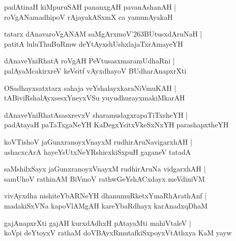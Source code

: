 \documentclass[twoside,12pt,openright]{book}
\def\S{\char'263}
\newcounter{shloka}[chapter]
\begin{document}
\begin{shloka}%
padAtinaH kiMpuruSAH pananxgAH pavanAshanAH |\\
roVgANamadhipoV rAjayakASxmX ca yamunAyakaH
\end{shloka}

\begin{shloka}%
tatarx dAnavaroVgANAM saMgArxmoV\S BUtusxdAruNaH |\\
patitA luluThuBuRmw deYtAyxshUshxlajaTxrAmayeYH
\end{shloka}

\begin{shloka}%
dAnaveYniRhatA roVgAH PeVtusasxmaramUdhaRni |\\
palAyaMcakirxreV keVsitf vAyxdhayoV BUdharAnapxrXti
\end{shloka}

\begin{shloka}%
OSadhayxsatxtarx sahaja veYshalayxkaraNiVmuKAH |\\
tABiviRshalAyxsesxYneyxVSu yuyudhurayxmakiMkarAH 
\end{shloka}

\begin{shloka}%
dAnaveYniRhatAsasxrevxV sharamudagxrapaTiTxsheYH |\\
padAtayaH paTaTxgaNeYH KaDegxYsitxVkeSxNxYH parashapxtheYH
\end{shloka}

\begin{shloka}%
koVTishoV jaGunxranoyxVnayxM rudhirAruNavigarxhAH |\\
ashacxcArA hayeYsUtxNeYRshicxkiSxpuH gaganeV tatadA 
\end{shloka}

\begin{shloka}%
saMshilxSayx jaGunxranoyxVnayxM rudhirAruNa vidgarxhAH |\\
samUhoV rathinAM BiVmoV rathwGeYshACxdayx meVdiniVM 
\end{shloka}

\begin{shloka}%
vivAyxdha nishiteYbARNeYH dhanumuRketxYmaRhArathAnf |\\
madakiSxVNa kapoVlAMgAH kareYbaRdhayx karAnadxqDhaM 	
\end{shloka}

\begin{shloka}%
gajAnapxrXti gajAH kurxdAdhxH pAtayaMti mahiVtaleV |\\
koVpi deYtoyxV rathaM doVBAyxRmutafkiSxpoyxVtAthxya KaM yayw
\end{shloka}
\end{document}
